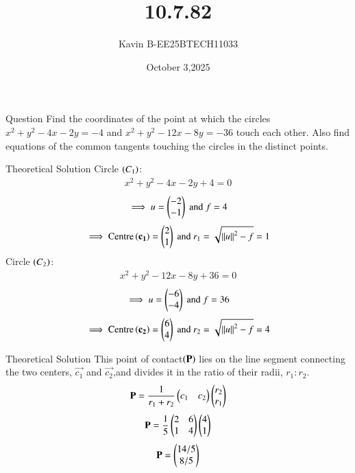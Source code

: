 \documentclass{beamer}
\begin{document}
\title 
{10.7.82}
\date{October 3,2025}


\author 
{Kavin B-EE25BTECH11033}






\frame{\titlepage}
\begin{frame}{Question}
Find the coordinates of the point at which the circles $x^2+y^2-4x-2y=-4$ and $x^2+y^2-12x-8y=-36$ touch each other. Also find equations of the common tangents touching the circles in the distinct points.\\  
\bigskip
\end{frame}



\begin{frame}{Theoretical Solution}
Circle $\left(C_1\right)$:
\begin{align}
    x^2+y^2-4x-2y+4=0
\end{align}
\begin{align}
    \implies u=\begin{pmatrix}-2\\-1\end{pmatrix}\text{ and }f=4  
\end{align}
\begin{align}
    \implies \text{Centre}\left(\mathbf{c_1}\right) = \begin{pmatrix}2\\1\end{pmatrix} \text{ and } r_1=\sqrt{\left\lVert u\right\rVert^2-f}=1
\end{align}
Circle $\left(C_2\right)$:
\begin{align}
    x^2+y^2-12x-8y+36=0
\end{align}
\begin{align}
    \implies u=\begin{pmatrix}-6\\-4\end{pmatrix}\text{ and }f=36  
\end{align}
\begin{align}
    \implies \text{Centre}\left(\mathbf{c_2}\right) = \begin{pmatrix}6\\4\end{pmatrix} \text{ and } r_2=\sqrt{\left\lVert u\right\rVert^2-f}=4
\end{align}
\end{frame}

\begin{frame}{Theoretical Solution}
This point of contact$\left(\mathbf{P}\right)$ lies on the line segment connecting the two centers, $\vec{c_1}$ and $\vec{c_2}$,and divides it in the ratio of their radii, $r_1:r_2$.
\begin{align}
    \mathbf{P} = \frac{1}{r_1+r_2}\begin{pmatrix}c_1 & c_2\end{pmatrix}\begin{pmatrix}r_2\\r_1\end{pmatrix}
\end{align}
\begin{align}
    \mathbf{P} = \frac{1}{5}\begin{pmatrix}2 & 6\\1 & 4\end{pmatrix}\begin{pmatrix}4\\1\end{pmatrix}
\end{align}
\begin{align}
    \mathbf{P} = \begin{pmatrix}14/5\\8/5\end{pmatrix}
\end{align}
\end{frame}
\end{document}
